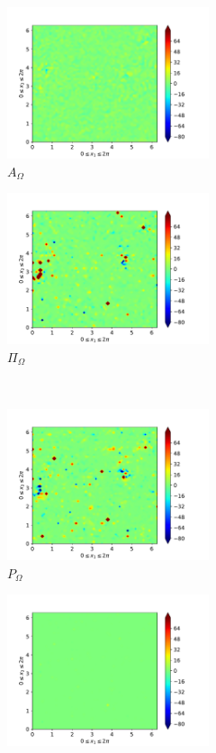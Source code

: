\begin{figure}[H]
\begin{subfigure}{0.45\textwidth}
        \includegraphics[height=1.75in]{media/run-cds-65/A-enst-1440}
        \caption{$A_{\Omega}$}
    \end{subfigure}
    \newline
    \begin{subfigure}{0.45\textwidth}
        \includegraphics[height=1.75in]{media/run-cds-65/Pi-enst-1440}
        \caption{$\Pi_{\Omega}$}
    \end{subfigure}
    ~
    \begin{subfigure}{0.45\textwidth}
        \includegraphics[height=1.75in]{media/run-cds-65/P-enst-1440}
        \caption{$P_{\Omega}$}
    \end{subfigure}
    \newline
    \begin{subfigure}{0.45\textwidth}
        \includegraphics[height=1.75in]{media/run-cds-65/B-enst-1440}

\end{subfigure}
\end{figure}
